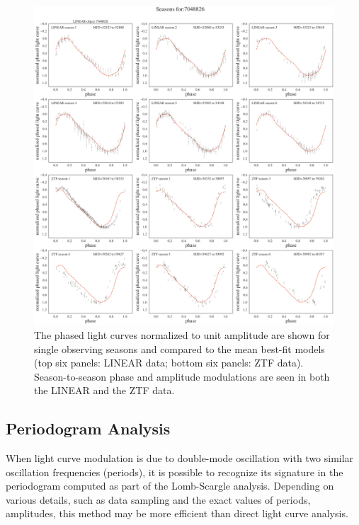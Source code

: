 \begin{figure}[ht]
    \centering
    \includegraphics[width=17cm]{LCplotBySeason7048826.png}
    \caption{The phased light curves normalized to unit amplitude are shown for single observing seasons
      and compared to the mean best-fit models (top six panels: LINEAR data; bottom six panels: ZTF data).
      Season-to-season phase and amplitude modulations are seen in both the LINEAR and the ZTF data.}
      \label{fig:phase4}
\end{figure}




\subsection{Periodogram Analysis} 



When light curve modulation is due to double-mode oscillation with two similar oscillation frequencies (periods),
it is possible to recognize its signature in the periodogram computed as part of the Lomb-Scargle analysis. Depending
on various details, such as data sampling and the exact values of periods, amplitudes, this method may be
more efficient than direct light curve analysis.

